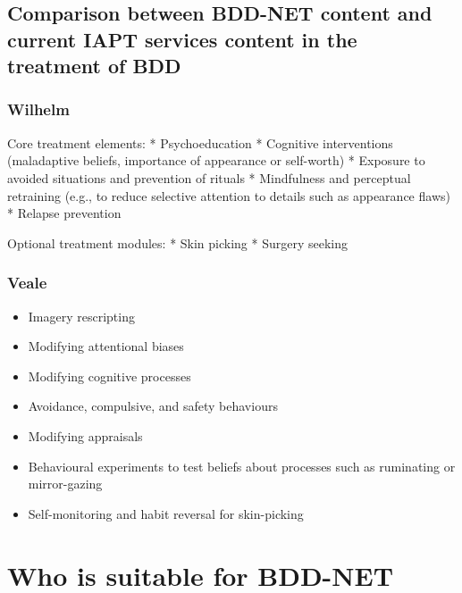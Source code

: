 \documentclass[]{book}
\providecommand{\tightlist}{%
  \setlength{\itemsep}{0pt}\setlength{\parskip}{0pt}}
\theoremstyle{definition}
\theoremstyle{definition}
\theoremstyle{definition}
\theoremstyle{remark}
\begin{document}
\hypertarget{comparison-between-bdd-net-content-and-current-iapt-services-content-in-the-treatment-of-bdd}{%
\subsection{Comparison between BDD-NET content and current IAPT services
content in the treatment of
BDD}\label{comparison-between-bdd-net-content-and-current-iapt-services-content-in-the-treatment-of-bdd}}

\hypertarget{wilhelm-wilhelm2013}{%
\subsubsection{\texorpdfstring{Wilhelm
\citep{wilhelm2013}}{Wilhelm {[}@wilhelm2013{]}}}\label{wilhelm-wilhelm2013}}

Core treatment elements: * Psychoeducation * Cognitive interventions
(maladaptive beliefs, importance of appearance or self-worth) * Exposure
to avoided situations and prevention of rituals * Mindfulness and
perceptual retraining (e.g., to reduce selective attention to details
such as appearance flaws) * Relapse prevention

Optional treatment modules: * Skin picking * Surgery seeking

\hypertarget{veale-veale2010}{%
\subsubsection{\texorpdfstring{Veale
\citep{veale2010}}{Veale {[}@veale2010{]}}}\label{veale-veale2010}}

\begin{itemize}
\tightlist
\item
  Imagery rescripting
\item
  Modifying attentional biases
\item
  Modifying cognitive processes
\item
  Avoidance, compulsive, and safety behaviours
\item
  Modifying appraisals
\item
  Behavioural experiments to test beliefs about processes such as
  ruminating or mirror-gazing
\item
  Self-monitoring and habit reversal for skin-picking
\end{itemize}

\hypertarget{who-is-suitable-for-bdd-net}{%
\section{Who is suitable for
BDD-NET}\label{who-is-suitable-for-bdd-net}}
\end{document}
